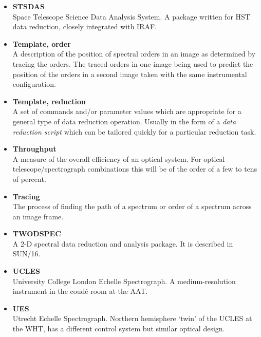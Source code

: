 \documentclass[twoside,11pt]{article}
\newcommand{\htmlref}[2]{#1}
\newcommand{\xref}[3]{#1}
\begin{document}
\begin{itemize}
\item {\bf\label{gl_stsdas}STSDAS}\\
      Space Telescope Science Data Analysis System.  A package written
      for \htmlref{HST}{gl_hst} data reduction, closely integrated with IRAF.

\item {\bf\label{gl_template_order}Template, order}\\
      A description of the position of spectral orders in an image
      as determined by tracing the orders.  The traced orders in one image
      being used to predict the position of the orders in a second image
      taken with the same instrumental configuration.

\item {\bf\label{gl_template_reduct}Template, reduction}\\
      A set of commands and/or parameter values which are appropriate for a
      general type of data reduction operation.  Usually in the form of a
      {\sl data reduction script} which can be tailored quickly for a
      particular reduction task.

\item {\bf\label{gl_throughput}Throughput}\\
      A measure of the overall efficiency of an optical system.
      For optical telescope/spectrograph combinations this will be of
      the order of a few to tens of percent.

\item {\bf\label{gl_tracing}Tracing}\\
      The process of finding the path of a spectrum or order of a spectrum
      across an image frame.

\item {\bf\label{gl_twodspec}TWODSPEC}\\
      A 2-D spectral data reduction and analysis package. It is described in 
      \xref{SUN/16}{sun16}{}.

\item {\bf\label{gl_ucles}UCLES}\\
      University College London Echelle Spectrograph.
      A medium-resolution instrument in the coud\'{e} room at the
      \htmlref{AAT}{gl_aao_aat}.

\item {\bf\label{gl_ues}UES}\\
      Utrecht Echelle Spectrograph.
      Northern hemisphere `twin' of the UCLES at the WHT, has a
      different control system but similar optical design.


\end{itemize}
\end{document}
